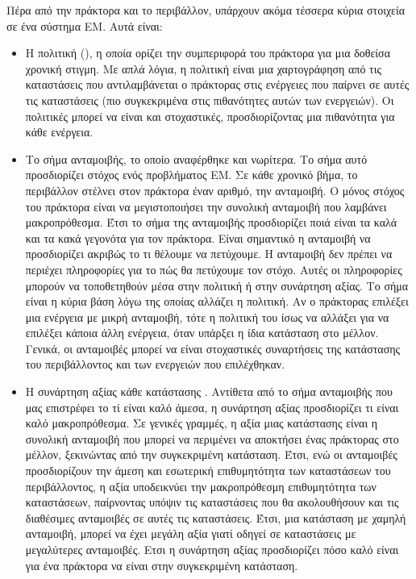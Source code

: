 Πέρα από την πράκτορα και το περιβάλλον, υπάρχουν ακόμα τέσσερα κύρια στοιχεία σε ένα σύστημα ΕΜ. Αυτά είναι:
\begin{itemize}
    \item Η πολιτική (), η οποία ορίζει την συμπεριφορά του πράκτορα για μια δοθείσα
          χρονική στιγμη. Με απλά λόγια, η πολιτική είναι μια χαρτογράφηση από τις καταστάσεις
          που αντιλαμβάνεται ο πράκτορας στις ενέργειες που παίρνει σε αυτές τις καταστάσεις (πιο συγκεκριμένα στις πιθανότητες αυτών των ενεργειών). Οι
          πολιτικές μπορεί να είναι και στοχαστικές, προσδιορίζοντας μια πιθανότητα για κάθε ενέργεια.
    \item Το σήμα ανταμοιβής, το οποίο αναφέρθηκε και νωρίτερα. Το σήμα αυτό προσδιορίζει στόχος ενός προβλήματος
          ΕΜ. Σε κάθε χρονικό βήμα, το περιβάλλον στέλνει στον πράκτορα έναν αριθμό, την ανταμοιβή.
          Ο μόνος στόχος του πράκτορα είναι να μεγιστοποιήσει την συνολική ανταμοιβή που λαμβάνει
          μακροπρόθεσμα. Έτσι το σήμα της ανταμοιβής προσδιορίζει	ποιά είναι τα καλά και τα κακά
          γεγονότα για τον πράκτορα. Είναι σημαντικό η ανταμοιβή να προσδιορίζει ακριβώς το
          τι θέλουμε να πετύχουμε. Η ανταμοιβή δεν πρέπει να περιέχει πληροφορίες
          για το πώς θα πετύχουμε τον στόχο. Αυτές οι πληροφορίες μπορούν να τοποθετηθούν μέσα στην πολιτική ή στην συνάρτηση αξίας.
          Το σήμα είναι η κύρια βάση λόγω της οποίας αλλάζει η πολιτική.
          Αν ο πράκτορας επιλέξει μια ενέργεια με μικρή ανταμοιβή, τότε η πολιτική του ίσως να αλλάξει
          για να επιλέξει κάποια άλλη ενέργεια, όταν υπάρξει η ίδια κατάσταση στο μέλλον. Γενικά, οι
          ανταμοιβές μπορεί να είναι στοχαστικές συναρτήσεις της κατάστασης του περιβάλλοντος και των
          ενεργειών που επιλέχθηκαν.
    \item Η συνάρτηση αξίας κάθε κατάστασης . Αντίθετα από το σήμα
          ανταμοιβής που μας επιστρέφει το τί είναι καλό άμεσα, η συνάρτηση αξίας προσδιορίζει τι είναι καλό μακροπρόθεσμα. Σε γενικές γραμμές, η αξία μιας κατάστασης είναι η συνολική ανταμοιβή που μπορεί να περιμένει
          να αποκτήσει ένας πράκτορας στο μέλλον, ξεκινώντας από την συγκεκριμένη κατάσταση. Έτσι, ενώ οι ανταμοιβές προσδιορίζουν την άμεση και εσωτερική επιθυμητότητα των καταστάσεων του περιβάλλοντος,
          η αξία υποδεικνύει την μακροπρόθεσμη επιθυμητότητα των καταστάσεων, παίρνοντας υπόψιν τις καταστάσεις
          που θα ακολουθήσουν και τις διαθέσιμες ανταμοιβές σε αυτές τις καταστάσεις. Έτσι, μια κατάσταση
          με χαμηλή ανταμοιβή, μπορεί να έχει μεγάλη αξία γιατί οδηγεί σε καταστάσεις με μεγαλύτερες ανταμοιβές. Ετσι η συνάρτηση αξίας προσδιορίζει πόσο καλό είναι για ένα πράκτορα να είναι στην συγκεκριμένη κατάσταση.

\end{itemize}
